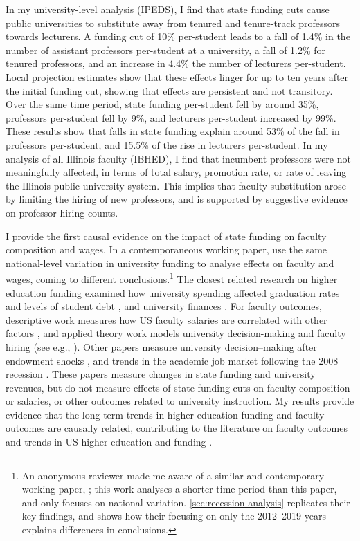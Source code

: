 In my university-level analysis (IPEDS), I find that state funding cuts cause public universities to substitute away from tenured and tenure-track professors towards lecturers.
A funding cut of 10\% per-student leads to a fall of 1.4\% in the number of assistant professors per-student at a university, a fall of 1.2\% for tenured professors, and an increase in 4.4\% the number of lecturers per-student.
Local projection estimates show that these effects linger for up to ten years after the initial funding cut, showing that effects are persistent and not transitory.
Over the same time period, state funding per-student fell by around 35\%, professors per-student fell by 9\%, and lecturers per-student increased by 99\%.
These results show that falls in state funding explain around 53\% of the fall in professors per-student,
and 15.5\% of the rise in lecturers per-student.
In my analysis of all Illinois faculty (IBHED), I find that incumbent professors were not meaningfully affected, in terms of total salary, promotion rate, or rate of leaving the Illinois public university system.
This implies that faculty substitution arose by limiting the hiring of new professors, and is supported by suggestive evidence on professor hiring counts.

I provide the first causal evidence on the impact of state funding on faculty composition and wages.
In a contemporaneous working paper, \cite{hinrichs2022state} use the same national-level variation in university funding to analyse effects on faculty and wages, coming to different conclusions.\footnote{
    An anonymous reviewer made me aware of a similar and contemporary working paper, \cite{hinrichs2022state}; this work analyses a shorter time-period than this paper, and only focuses on national variation.
    \autoref{sec:recession-analysis} replicates their key findings, and shows how their focusing on only the 2012--2019 years explains differences in conclusions.
}
The closest related research on higher education funding examined how university spending affected graduation rates and levels of student debt \citep{NBERw23736,NBERw27885}, and university finances \citep{miller2022making,bound2019public,webber2017state}.
For faculty outcomes, descriptive work measures how US faculty salaries are correlated with other factors \citep{hilmer2020labor}, and applied theory work models university decision-making and faculty hiring (see e.g., \citealt{abe2015implications,johnson2009jep,NBERc13879}).
Other papers measure university decision--making after endowment shocks \citep{brown2014endowment}, and trends in the academic job market following the 2008 recession \citep{turner2014impact}.
These papers measure changes in state funding and university revenues, but do not measure effects of state funding cuts on faculty composition or salaries, or other outcomes related to university instruction.
My results provide evidence that the long term trends in higher education funding and faculty outcomes are causally related, contributing to the literature on faculty outcomes \citep{ehrenberg2003studying} and trends in US higher education and funding \citep{hoxby2009changing,ehrenberg2012american}.


